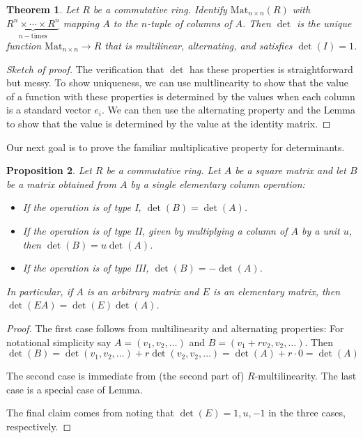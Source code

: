 \documentclass[12pt]{report}
\newtheorem{theorem}{Theorem}[chapter]
\newtheorem{proposition}[theorem]{Proposition}
\numberwithin{equation}{section}
\numberwithin{theorem}{chapter}
\theoremstyle{definition}
\newtheorem*{basic properties}{Basic Properties}
\newtheorem*{Important Remark}{Important Remark}
\begin{document}
\begin{theorem} Let $R$ be a commutative ring. Identify $\mathrm{Mat}_{n\times n}(R)$ with $\underbrace{R^n \times \cdots \times R^n}_{n-\text{times}}$ mapping $A$ to the $n$-tuple of columns of $A$. Then $\det$ is the unique function $\mathrm{Mat}_{n\times n} \to R$ that is multilinear, alternating, and satisfies $\det(I) = 1$.
\end{theorem}
\begin{proof}[Sketch of proof]
The verification that $\det$ has these properties is straightforward but messy. To show uniqueness, we can use multlinearity to show that the value of a function with these properties is determined by the values when each column is a standard vector $e_i$. We can then use the alternating property and the Lemma to show that the value is determined by the value at the identity matrix.
\end{proof}

Our next goal is to prove the familiar multiplicative property for determinants. 

\begin{proposition}  Let $R$ be a commutative ring. Let $A$ be a square matrix and let $B$ be a matrix obtained from $A$
  by a single elementary column operation: 
  \begin{itemize}
  \item If the operation is of type I, $\det(B) = \det(A)$.
  \item If the operation is of type II, given by multiplying a column of $A$ by a unit $u$, then $\det(B) = u \det(A)$.
  \item If the operation is of type III, $\det(B) = - \det(A)$.
    \end{itemize}
    In particular, if $A$ is an arbitrary matrix and $E$ is an elementary matrix, then $\det(EA)=\det(E)\det(A)$.
\end{proposition}

\begin{proof} The first case follows from  multilinearity and alternating properties: For notational simplicity say $A = (v_1, v_2, \dots)$ and
  $B = (v_1 + rv_2, v_2, \dots)$. Then
  $$
  \det(B) = \det(v_1, v_2, \dots) + r \det(v_2, v_2, \dots) = \det(A) + r \cdot 0 = \det(A)
  $$

The second case is immediate from (the second part of) $R$-multilinearity.
The last case is a special case of Lemma. 

The final claim comes from noting that $\det(E)=1,u,-1$ in the three cases, respectively.
\end{proof}
\end{document}
